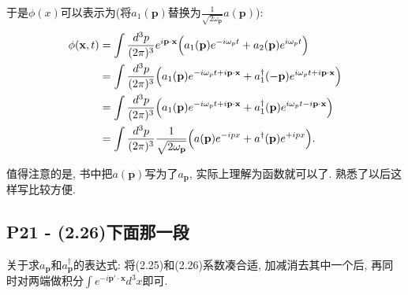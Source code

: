 \documentclass[10pt,b5paper,openany]{book}
\begin{document}
于是$\phi(x)$可以表示为(将$a_1(\mathbf{p})$替换为$\frac{1}{\sqrt{2\omega_\mathbf{p}}} a(\mathbf{p})$): 
\begin{equation}
  \begin{aligned}
  \phi(\mathbf{x}, t) &= \int \frac{d^3 p}{(2\pi)^3}e^{i\mathbf{p \cdot x}}\Bigl(a_1(\mathbf{p})e^{-i\omega_p t} + a_2(\mathbf{p})e^{i\omega_p t}\Bigr) \\
  &= \int \frac{d^3 p}{(2\pi)^3}\Bigl(a_1(\mathbf{p})e^{-i\omega_p t +i\mathbf{p \cdot x}} + a_1^{\dagger}(-\mathbf{p})e^{i\omega_p t+i\mathbf{p \cdot x}}\Bigr) \\
  &= \int \frac{d^3 p}{(2\pi)^3}\Bigl(a_1(\mathbf{p})e^{-i\omega_p t + i\mathbf{p \cdot x}} + a_1^{\dagger}(\mathbf{p})e^{i\omega_p t - i\mathbf{p \cdot x}}\Bigr) \\
  &= \int \frac{d^3 p}{(2\pi)^3} \frac{1}{\sqrt{2 \omega_\mathbf{p}}} \Bigl(a(\mathbf{p})e^{-ipx} + a^{\dagger}(\mathbf{p})e^{+ipx}\Bigr). 
  \end{aligned}
\end{equation}

值得注意的是, 书中把$a(\mathbf{p})$写为了$a_\mathbf{p}$, 实际上理解为函数就可以了. 熟悉了以后这样写比较方便. 

\begin{center}
\end{center}

\subsection{P21 - (2.26)下面那一段}

关于求$a_\mathbf{p}$和$a^{\dagger}_\mathbf{p}$的表达式: 将(2.25)和(2.26)系数凑合适, 加减消去其中一个后, 再同时对两端做积分$\int e^{-i\mathbf{p'\cdot x}} d^3 x$即可. 

\begin{center}
\end{center}
\end{document}
